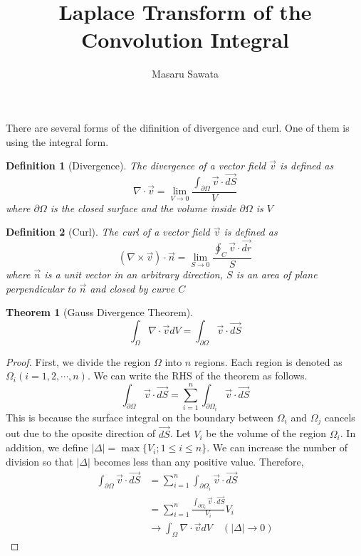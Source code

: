 \documentclass[letterpaper, 12pt]{article}
\title{Laplace Transform of the Convolution Integral}
\author{Masaru Sawata}
\theoremstyle{custom}
\newtheorem{definition}{Definition}
\newtheorem*{theorem}{Theorem}
\begin{document}
\maketitle
There are several forms of the difinition of divergence and curl. One of them is using the integral form.
\begin{definition}[Divergence]
  The divergence of a vector field $\vec{v}$ is defined as
  \begin{equation*}
    \nabla \cdot \vec{v} = \lim_{V \rightarrow 0} \frac{\displaystyle \int_{\partial \Omega} \vec{v} \cdot \vec{dS}}{V}
  \end{equation*}
  where $\partial \Omega$ is the closed surface and the volume inside $\partial \Omega$ is $V$
\end{definition}

\bigskip

\begin{definition}[Curl]
  The curl of a vector field $\vec{v}$ is defined as
  \begin{equation*}
    \left( \nabla \times \vec{v} \right) \cdot \vec{n} = \lim_{S \rightarrow 0} \frac{\displaystyle \oint_{C} \vec{v} \cdot \vec{dr}}{S}
  \end{equation*}
  where $\vec{n}$ is a unit vector in an arbitrary direction, $S$ is an area of plane perpendicular to $\vec{n}$ and closed by curve $C$
\end{definition}

\bigskip

\begin{theorem}[Gauss Divergence Theorem]
  \begin{equation*}
    \int_{\Omega} \nabla \cdot \vec{v} dV = \int_{\partial \Omega} \vec{v} \cdot \vec{dS}
  \end{equation*}
\end{theorem}
\begin{proof}
  First, we divide the region $\Omega$ into $n$ regions. Each region is denoted as $\Omega_i (i=1,2,\cdots , n)$.
  We can write the RHS of the theorem as follows.
  \begin{equation*}
    \int_{\partial \Omega} \vec{v} \cdot \vec{dS} = \sum_{i=1}^{n}\int_{\partial \Omega_i} \vec{v} \cdot \vec{dS}
  \end{equation*}
  This is because the surface integral on the boundary between $\Omega_i$ and $\Omega_j$ cancels out due to the oposite direction of $\vec{dS}$.
  Let $V_i$ be the volume of the region $\Omega_i$. In addition, we define $| \Delta |=\max \{ V_i;1 \leq i \leq n \}$.
  We can increase the number of division so that $| \Delta |$ becomes less than any positive value. Therefore,
  \begin{align*}
    \int_{\partial \Omega} \vec{v} \cdot \vec{dS} 
    &= \sum_{i=1}^{n}\int_{\partial \Omega_i} \vec{v} \cdot \vec{dS}\\
    &= \sum_{i=1}^{n}\frac{\displaystyle \int_{\partial \Omega_i} \vec{v} \cdot \vec{dS}}{V_i} V_i\\
    &\rightarrow \int_{\Omega} \nabla \cdot \vec{v} dV \quad (|\Delta| \rightarrow 0)
  \end{align*}
\end{proof}
\end{document}
